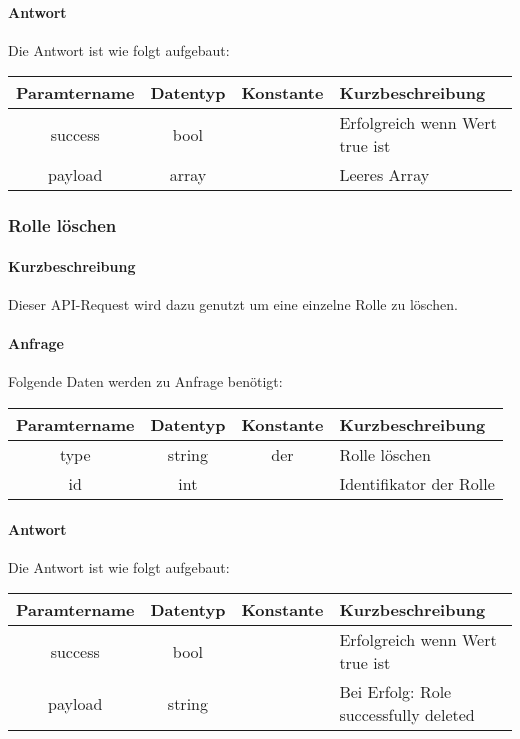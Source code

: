 \paragraph{Antwort}Die Antwort ist wie folgt aufgebaut:
\begin{table}[H]
	\begin{tabular}{|c|c|c|p{6.5cm}|}
		\hline
		\textbf{Paramtername} & \textbf{Datentyp} & \textbf{Konstante} & \textbf{Kurzbeschreibung}            \\ \hline                
		success             & bool             &                 & Erfolgreich wenn Wert {\glqq true\grqq} ist \\ \hline
		payload             & array            &                 & Leeres Array \\ \hline
	\end{tabular}
\end{table}
\subsubsection{Rolle löschen}
\paragraph{Kurzbeschreibung}Dieser API-Request wird dazu genutzt um eine einzelne Rolle zu löschen.
\paragraph{Anfrage}Folgende Daten werden zu Anfrage benötigt:
\begin{table}[H]
	\begin{tabular}{|c|c|c|p{6.5cm}|}
		\hline
		\textbf{Paramtername} & \textbf{Datentyp} & \textbf{Konstante} & \textbf{Kurzbeschreibung}                                                                                               \\ \hline
		type                & string            & der                & Rolle löschen \\ \hline
		id                  & int               &                    & Identifikator der Rolle \\ \hline
	\end{tabular}
\end{table}
\paragraph{Antwort}Die Antwort ist wie folgt aufgebaut:
\begin{table}[H]
	\begin{tabular}{|c|c|c|p{6.5cm}|}
		\hline
		\textbf{Paramtername} & \textbf{Datentyp} & \textbf{Konstante} & \textbf{Kurzbeschreibung}            \\ \hline                
		success             & bool             &                 & Erfolgreich wenn Wert {\glqq true\grqq} ist \\ \hline
		payload             & string           &                 & Bei Erfolg: {\glqq Role successfully deleted\grqq} \\ \hline
	\end{tabular}
\end{table}
